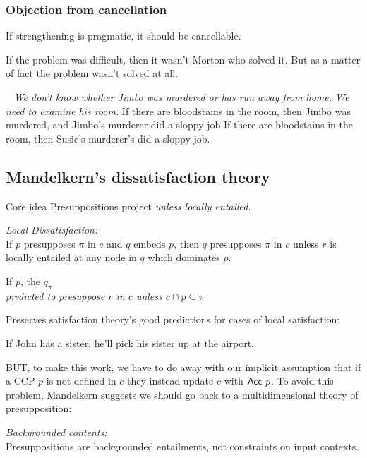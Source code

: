 \documentclass[cronos,landscape,paper=letter]{ling-handout}
\begin{document}
\subsubsection{Objection from cancellation}

If strengthening is pragmatic, it should be cancellable.

\ex
If the problem was difficult, then it wasn't Morton who solved it. But as a matter of fact the problem wasn't solved at all.
\xe

\pex~
\textit{We don't know whether Jimbo was murdered or has run away from home. We need to examine his room.}
\a If there are bloodstains in the room, then Jimbo was murdered, and Jimbo's murderer did a sloppy job
\a\ljudge{\#}If there are bloodstains in the room, then Susie's murderer's did a sloppy job.
\xe

\subsection{Mandelkern's dissatisfaction theory}

\begin{tcolorbox}
  Core idea
  \tcblower
  Presuppositions project \textit{unless locally entailed}.
  \end{tcolorbox}

  \ex
  \textit{Local Dissatisfaction:}\\
  If \(p\) presupposes \(\pi\) in \(c\) and \(q\)  embeds \(p\), then \(q\) presupposes \(\pi\) in \(c\) unless \(r\) is locally entailed at any node in \(q\) which dominates \(p\).
  \xe

  \ex
  If \(p\), the \(q_{\pi}\)\\
  \textit{predicted to presuppose \(r\) in \(c\) unless \(c ∩ p ⊆ π\)}
  \xe

  Preserves satisfaction theory's good predictions for cases of local satisfaction:

  \ex
  If John has a sister, he'll pick his sister up at the airport.
  \xe

  BUT, to make this work, we have to do away with our implicit assumption that if a CCP \(p\) is not defined in \(c\) they instead update \(c\) with \(\ml{Acc} p\). To avoid this problem, Mandelkern suggests we should go back to a multidimensional theory of presupposition:

  \ex
  \textit{Backgrounded contents:}\\
  Presuppositions are backgrounded entailments, not constraints on input contexts.
  \xe
\end{document}
